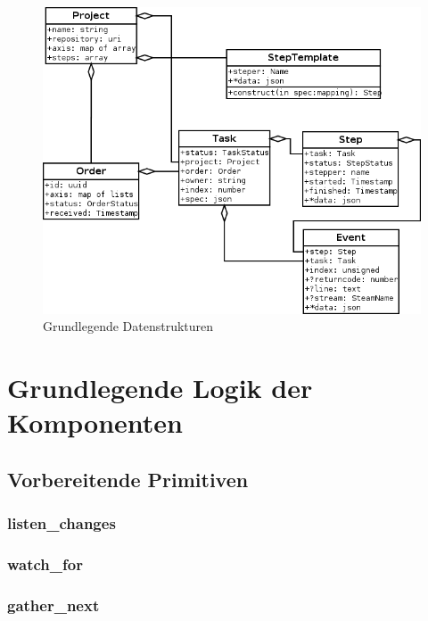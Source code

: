 \begin{figure}[ht] 
  \label{fig:datenstrukturen}
  \begin{center}
      \includegraphics[width=\textwidth]{imageinput/datenstrukturen-step-templates.png}
  \end{center}
  \caption{Grundlegende Datenstrukturen}
\end{figure}




\section{Grundlegende Logik der Komponenten} %


\subsection{Vorbereitende Primitiven}

\subsubsection{listen\_changes}
\subsubsection{watch\_for}
\subsubsection{gather\_next}
